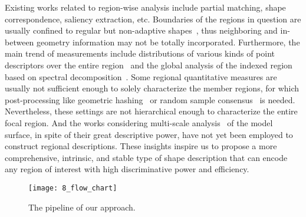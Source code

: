 Existing works related to region-wise analysis
include partial matching, shape correspondence, saliency extraction,
etc. Boundaries of the regions in question are usually confined to
regular but non-adaptive
shapes~\cite{Kazhdan:2003,Mortara:03,Gatzke:2005,Kokkinos:2012},
thus neighboring and in-between geometry information may not be
totally incorporated. Furthermore, the main trend of measurements
include distributions of various kinds of point descriptors over the
entire region~\cite{Osada:2002,Ben-Chen:2008,Liu:2006} and the
global analysis of the indexed region based on spectral
decomposition~\cite{Hu2009,Lavoue:2012}. Some regional
quantitative measures are usually not sufficient enough to solely
characterize the member regions, for which post-processing like
geometric hashing~\cite{Yehezkel:1988} or random sample
consensus~\cite{Fischler:1981} is needed. Nevertheless, these
settings are not hierarchical enough to characterize the entire
focal region. And the works considering multi-scale
analysis~\cite{Rustamov2011,Sun:2009:CGF} of the model
surface, in spite of their great descriptive power, have not yet
been employed to construct regional descriptions. These insights
inspire us to propose a more comprehensive, intrinsic, and stable type
of shape description that can encode any region of interest with high
discriminative power and efficiency.


\begin{figure}[!to]
\begin{center}
\texttt{[image: 8\_flow\_chart]}
\end{center}
\caption{The pipeline of our approach.}
\label{pipeline}
\end{figure}

